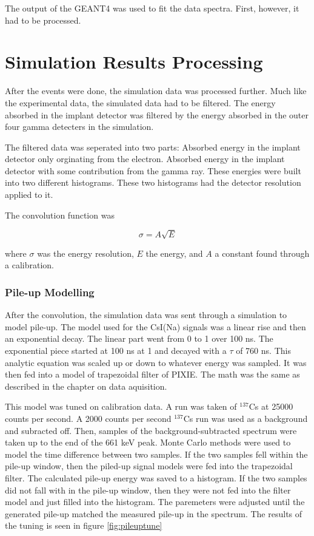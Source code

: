 

The output of the GEANT4 was used to fit the data spectra. 
First, however, it had to be processed. 

\section{Simulation Results Processing}
After the events were done, the simulation data was processed further. 
Much like the experimental data, the simulated data had to be filtered.
The energy absorbed in the implant detector was filtered by the energy absorbed in the outer four gamma detecters in the simulation.

The filtered data was seperated into two parts:
Absorbed energy in the implant detector only orginating from the electron.
Absorbed energy in the implant detector with some contribution from the gamma ray.
These energies were built into two different histograms.
These two histograms had the detector resolution applied to it. 

The convolution function was

\begin{equation}
	\sigma = A\sqrt{E}
	\label{eq:convo}
\end{equation}

where $\sigma$ was the energy resolution, $E$ the energy, and $A$ a constant found through a calibration.

\subsubsection{Pile-up Modelling}
After the convolution, the simulation data was sent through a simulation to model pile-up.
The model used for the CsI(Na) signals was a linear rise and then an exponential decay.
The linear part went from 0 to 1 over 100 ns. 
The exponential piece started at 100 ns at 1 and decayed with a $\tau$ of 760 ns.
This analytic equation was scaled up or down to whatever energy was sampled.
It was then fed into a model of trapezoidal filter of PIXIE. 
The math was the same as described in the chapter on data aquisition.


This model was tuned on calibration data. 
A run was taken of $^{137}$Cs at 25000 counts per second.
A 2000 counts per second $^{137}$Cs run was used as a background and subracted off.
Then, samples of the background-subtracted spectrum were taken up to the end of the 661 keV peak.
Monte Carlo methods were used to model the time difference between two samples.
If the two samples fell within the pile-up window, then the piled-up signal models were fed into the trapezoidal filter.
The calculated pile-up energy was saved to a histogram.
If the two samples did not fall with in the pile-up window, then they were not fed into the filter model and just filled into the histogram.
The paremeters were adjusted until the generated pile-up matched the measured pile-up in the spectrum.
The results of the tuning is seen in figure \ref{fig:pileuptune}

